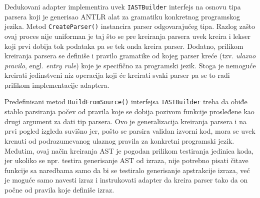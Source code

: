 Dedukovani adapter implementira uvek \texttt{IASTBuilder} interfejs na osnovu tipa parsera koji je generisao ANTLR alat za gramatiku konkretnog programskog jezika. Metod \texttt{CreateParser()} instancira parser odgovarajućeg tipa. Razlog zašto ovaj proces nije uniforman je taj što se pre kreiranja parsera uvek kreira i lekser koji prvi dobija tok podataka pa se tek onda kreira parser. Dodatno, prilikom kreiranja parsera se definiše i pravilo gramatike od kojeg parser kreće (tzv. \emph{ulazno pravilo}, engl. \emph{entry rule}) koje je specifično za programski jezik. Stoga je nemoguće kreirati jedinstveni niz operacija koji će kreirati svaki parser pa se to radi prilikom implementacije adaptera. 

Predefinisani metod \texttt{BuildFromSource()} interfejsa \texttt{IASTBuilder} treba da obiđe stablo parsiranja počev od pravila koje se dobija pozivom funkcije prosleđene kao drugi argument za dati tip parsera. Ovo je generalizacija kreiranja parsera i na prvi pogled izgleda suvišno jer, pošto se parsira validan izvorni kod, mora se uvek krenuti od podrazumevanog ulaznog pravila za konkretni programski jezik. Međutim, ovaj način kreiranja AST je pogodan prilikom testiranja jedinica koda, jer ukoliko se npr. testira generisanje AST od izraza, nije potrebno pisati čitave funkcije sa naredbama samo da bi se testiralo generisanje apstrakcije izraza, već je moguće samo navesti izraz i instrukovati adapter da kreira parser tako da on počne od pravila koje definiše izraz.
